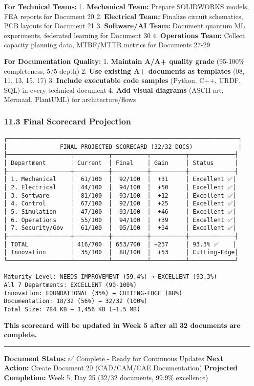 \documentclass[
]{article}
\begin{document}
\textbf{For Technical Teams:} 1. \textbf{Mechanical Team:} Prepare
SOLIDWORKS models, FEA reports for Document 20 2. \textbf{Electrical
Team:} Finalize circuit schematics, PCB layouts for Document 21 3.
\textbf{Software/AI Team:} Document quantum ML experiments, federated
learning for Document 30 4. \textbf{Operations Team:} Collect capacity
planning data, MTBF/MTTR metrics for Documents 27-29

\textbf{For Documentation Quality:} 1. \textbf{Maintain A/A+ quality
grade} (95-100\% completeness, 5/5 depth) 2. \textbf{Use existing A+
documents as templates} (08, 11, 13, 15, 17) 3. \textbf{Include
executable code samples} (Python, C++, URDF, SQL) in every technical
document 4. \textbf{Add visual diagrams} (ASCII art, Mermaid, PlantUML)
for architecture/flows

\hypertarget{final-scorecard-projection}{%
\subsubsection{11.3 Final Scorecard
Projection}\label{final-scorecard-projection}}

\begin{verbatim}
┌──────────────────────────────────────────────────────────────────┐
│               FINAL PROJECTED SCORECARD (32/32 DOCS)             │
├──────────────────┬──────────┬──────────┬──────────┬─────────────┤
│ Department       │ Current  │ Final    │ Gain     │ Status      │
├──────────────────┼──────────┼──────────┼──────────┼─────────────┤
│ 1. Mechanical    │  61/100  │  92/100  │  +31     │ Excellent ✅│
│ 2. Electrical    │  44/100  │  94/100  │  +50     │ Excellent ✅│
│ 3. Software      │  81/100  │  93/100  │  +12     │ Excellent ✅│
│ 4. Control       │  67/100  │  92/100  │  +25     │ Excellent ✅│
│ 5. Simulation    │  47/100  │  93/100  │  +46     │ Excellent ✅│
│ 6. Operations    │  55/100  │  94/100  │  +39     │ Excellent ✅│
│ 7. Security/Gov  │  61/100  │  95/100  │  +34     │ Excellent ✅│
├──────────────────┼──────────┼──────────┼──────────┼─────────────┤
│ TOTAL            │ 416/700  │ 653/700  │ +237     │ 93.3% ✅    │
│ Innovation       │  35/100  │  88/100  │  +53     │ Cutting-Edge│
└──────────────────┴──────────┴──────────┴──────────┴─────────────┘

Maturity Level: NEEDS IMPROVEMENT (59.4%) → EXCELLENT (93.3%)
All 7 Departments: EXCELLENT (90-100%)
Innovation: FOUNDATIONAL (35%) → CUTTING-EDGE (88%)
Documentation: 18/32 (56%) → 32/32 (100%)
Total Size: 784 KB → 1,456 KB (~1.5 MB)
\end{verbatim}

\textbf{This scorecard will be updated in Week 5 after all 32 documents
are complete.}

\begin{center}\rule{0.5\linewidth}{0.5pt}\end{center}

\textbf{Document Status:} ✅ Complete - Ready for Continuous Updates
\textbf{Next Action:} Create Document 20 (CAD/CAM/CAE Documentation)
\textbf{Projected Completion:} Week 5, Day 25 (32/32 documents, 99.9\%
excellence)
\end{document}
